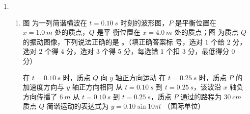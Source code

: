 \begin{enumerate}
\begin{enumerate}
\begin{enumerate}
\end{enumerate}
\begin{figure}[h!]
	\flushright
	
\end{figure}





\end{enumerate}

\item 
{}
\begin{enumerate}
	\item
图  为一列简谐横波在 $ t=0.10 \ s $ 时刻的波形图，$ P $ 是平衡位置在 $ x=1.0 \ m $ 处的质点，$ Q $ 是平
衡位置在 $ x=4.0 \ m $ 处的质点；图  为质点 $ Q $ 的振动图像，下列说法正确的是
 \underlinegap 
。（填正确答案标
号，选对 $ 1 $ 个给 $ 2 $ 分，选对 $ 2 $ 个得 $ 4 $ 分，选对 $ 3 $ 个得 $ 5 $ 分，每选错 $ 1 $ 个扣 $ 3 $ 分，最低得分 $ 0 $ 分）
\begin{figure}[h!]
	\centering
\begin{subfigure}{0.4\linewidth}
	\centering
	 
	\caption{}\label{2014全国234a}
\end{subfigure}
\begin{subfigure}{0.4\linewidth}
	\centering
	 
	\caption{}\label{2014全国234b}
\end{subfigure}

\end{figure}


\fivechoices
{在 $ t=0.10 \ s $ 时，质点 $ Q $ 向 $ y $ 轴正方向运动}
{在 $ t=0.25 \ s $ 时，质点 $ P $ 的加速度方向与 $ y $ 轴正方向相同}
{从 $ t=0.10 \ s $ 到 $ t=0.25 \ s $，该波沿 $ x $ 轴负方向传播了 $ 6 \ m $}
{从 $ t=0.10 \ s $ 到 $ t=0.25 \ s $，质点 $ P $ 通过的路程为 $ 30 \ cm $}
{质点 $ Q $ 简谐运动的表达式为 $ y=0.10 \sin 10 \pi t $ （国际单位）}



\end{enumerate}
\end{enumerate}
